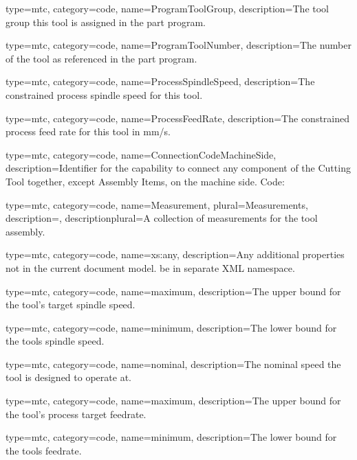 {
  type=mtc,
  category=code,
  name={ProgramToolGroup},
  description={The tool group this tool is assigned in the part program.}
}

{
  type=mtc,
  category=code,
  name={ProgramToolNumber},
  description={The number of the tool as referenced in the part program.}
}

{
  type=mtc,
  category=code,
  name={ProcessSpindleSpeed},
  description={The constrained process spindle speed for this tool.}
}

{
  type=mtc,
  category=code,
  name={ProcessFeedRate},
  description={The constrained process feed rate for this tool in mm/s.}
}

{
  type=mtc,
  category=code,
  name={ConnectionCodeMachineSide},
  description={Identifier for the capability to connect any component of the Cutting Tool together, except Assembly Items, on the machine side. Code: }
}

{
  type=mtc,
  category=code,
  name={Measurement},
  plural={Measurements},
  description={},
  descriptionplural={A collection of measurements for the tool assembly.}
}

{
  type=mtc,
  category=code,
  name={xs:any},
  description={Any additional properties not in the current document model. \MUST be in separate XML namespace.}
}

{
  type=mtc,
  category=code,
  name={maximum},
  description={The upper bound for the tool’s target spindle speed.}
}

{
  type=mtc,
  category=code,
  name={minimum},
  description={The lower bound for the tools spindle speed.}
}

{
  type=mtc,
  category=code,
  name={nominal},
  description={The nominal speed the tool is designed to operate at.}
}


{
  type=mtc,
  category=code,
  name={maximum},
  description={The upper bound for the tool’s process target feedrate.}
}

{
  type=mtc,
  category=code,
  name={minimum},
  description={The lower bound for the tools feedrate.}
}

